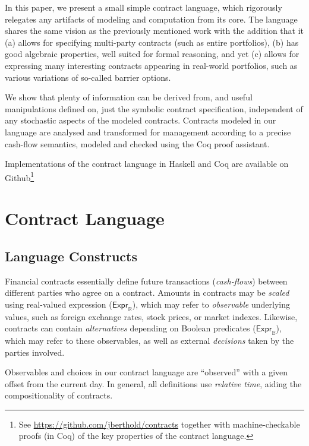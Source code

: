 \documentclass[a4paper,debug,twocolumn]{easychair}
\newcommand\type[1]{\mathsf{#1}}
\newcommand\reals{{\mathbb R}}
\newcommand\bools{{\mathbb B}}
\theoremstyle{plain}
\begin{document}
In this paper, we present a small simple contract language, which
rigorously relegates any artifacts of modeling and computation from
its core. The language shares the same vision as the previously
mentioned work with the addition that it (a) allows for specifying
multi-party contracts (such as entire portfolios), (b) has good
algebraic properties, well suited for formal reasoning, and yet (c)
allows for expressing many interesting contracts appearing in
real-world portfolios, such as various variations of so-called barrier
options.

We show that plenty of information can be derived from, and useful
manipulations defined on, just the symbolic contract specification,
independent of any stochastic aspects of the modeled contracts.
Contracts modeled in our language are analysed and transformed for
management according to a precise cash-flow semantics, modeled and
checked using the Coq proof assistant.

Implementations of the contract language in Haskell and Coq are
available on Github\footnote{See
  \url{https://github.com/jberthold/contracts} together with
  machine-checkable proofs (in Coq) of the key properties of the
  contract language.}

\section{Contract Language}
\label{sec:contract-language}

\subsection{Language Constructs}
\label{sec:language-constructs}

Financial contracts essentially define future transactions (\emph{cash-flows})
between different parties who agree on a contract.
Amounts in contracts may be \emph{scaled} using real-valued expression
($\type{Expr}_\reals$), which may refer to \emph{observable} underlying
values, such as foreign exchange rates, stock prices, or market indexes.
Likewise, contracts can contain \emph{alternatives} depending on Boolean
predicates ($\type{Expr}_\bools$), which may refer to these observables,
as well as external \emph{decisions} taken by the parties involved.

Observables and choices in our contract language are ``observed'' with
a given offset from the current day.
In general, all definitions use \emph{relative time},
aiding the compositionality of contracts.  
\end{document}
